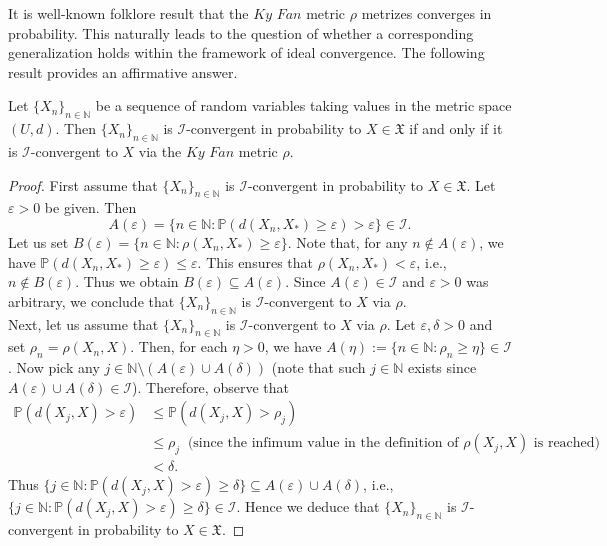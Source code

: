 \documentclass[reqno]{amsart}
\begin{document}
It is well-known folklore result that the $Ky$ $Fan$ metric $\rho$ metrizes converges in probability. This naturally leads to the question of whether a corresponding generalization holds within the framework of ideal convergence. The following result provides an affirmative answer.
\begin{proposition}\label{pro 1}
Let $\{X_n\}_{n\in\mathbb{N}}$ be a sequence of random variables taking values in the metric space $(U,d)$. Then $\{X_n\}_{n\in\mathbb{N}}$ is $\mathcal{I}$-convergent in probability to $X\in \mathfrak{X}$ if and only if it is $\mathcal{I}$-convergent to $X$ via the $Ky$ $Fan$ metric $\rho$.
\end{proposition}
\begin{proof}
First assume that $\{X_n\}_{n\in\mathbb{N}}$ is $\mathcal{I}$-convergent in probability to $X\in \mathfrak{X}$. Let $\varepsilon>0$ be given. Then 
$$
A(\varepsilon)=\{n\in\mathbb{N}:\mathbb{P}(d(X_n,X_*)\geq \varepsilon)> \varepsilon\}\in \mathcal{I}.
$$
Let us set $B(\varepsilon)=\{n\in\mathbb{N}:\rho(X_n,X_*)\geq \varepsilon\}$. Note that, for any $n\notin A(\varepsilon)$, we have $\mathbb{P}(d(X_n,X_*)\geq \varepsilon)\leq\varepsilon$. This ensures that $\rho(X_n,X_*)<\varepsilon$, i.e.,  $n\notin B(\varepsilon)$. Thus we obtain  $B(\varepsilon)\subseteq A(\varepsilon)$. Since  $A(\varepsilon)\in\mathcal{I}$ and $\varepsilon>0$ was arbitrary, we conclude that $\{X_n\}_{n\in\mathbb{N}}$ is $\mathcal{I}$-convergent to $X$ via $\rho$.\\

Next, let us assume that $\{X_n\}_{n\in\mathbb{N}}$ is $\mathcal{I}$-convergent to $X$ via $\rho$. Let $\varepsilon,\delta>0$ and set $\rho_n=\rho(X_n,X)$. Then, for each $\eta>0$, we have $A(\eta):=\{n\in\mathbb{N}:\rho_n\geq \eta\}\in\mathcal{I}$. Now pick any $j\in \mathbb{N}\setminus (A(\varepsilon)\cup A(\delta))$ (note that such $j\in\mathbb{N}$ exists since $A(\varepsilon)\cup A(\delta)\in \mathcal{I}$). Therefore, observe that 
\begin{align*}
	\mathbb{P}(d(X_j,X)>\varepsilon)&\leq \mathbb{P}(d(X_j,X)>\rho_j)\\
	&\leq \rho_j~\mbox{ (since the infimum value in the definition of $\rho(X_j,X)$ is reached)}\\
	&<\delta.
\end{align*}
Thus  $\{j\in\mathbb{N}:\mathbb{P}(d(X_j,X)>\varepsilon)\geq\delta\}\subseteq A(\varepsilon)\cup A(\delta)$, i.e., $\{j\in\mathbb{N}:\mathbb{P}(d(X_j,X)>\varepsilon)\geq\delta\}\in\mathcal{I}$. Hence we deduce that  $\{X_n\}_{n\in\mathbb{N}}$ is $\mathcal{I}$-convergent in probability to $X\in \mathfrak{X}$.
\end{proof}
\end{document}
